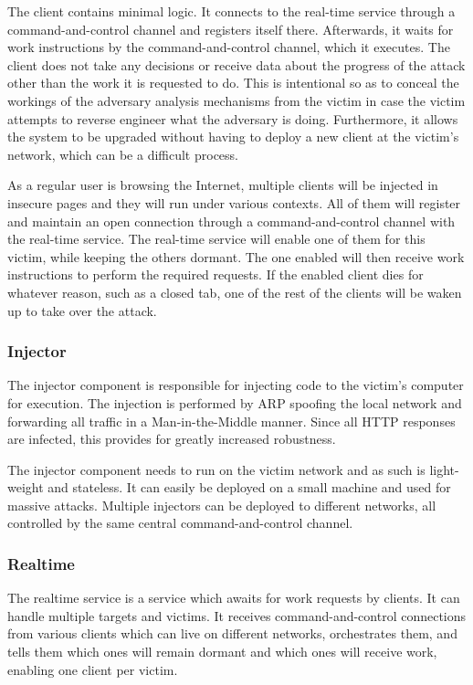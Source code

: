 \documentclass[conference, letterpaper, 10pt]{IEEEtran}
\begin{document}
The client contains minimal logic. It connects to the real-time service through
a command-and-control channel and registers itself there. Afterwards, it waits
for work instructions by the command-and-control channel, which it executes. The
client does not take any decisions or receive data about the progress of the
attack other than the work it is requested to do. This is intentional so as
to conceal the workings of the adversary analysis mechanisms from the victim
in case the victim attempts to reverse engineer what the adversary is doing.
Furthermore, it allows the system to be upgraded without having to deploy a
new client at the victim's network, which can be a difficult process.

As a regular user is browsing the Internet, multiple clients will be
injected in insecure pages and they will run under various contexts. All of
them will register and maintain an open connection through a
command-and-control channel with the real-time service. The real-time
service will enable one of them for this victim, while keeping the others
dormant. The one enabled will then receive work instructions to perform the
required requests. If the enabled client dies for whatever reason, such as a
closed tab, one of the rest of the clients will be waken up to take over the
attack.

\subsubsection{Injector}

The injector component is responsible for injecting code to the victim's
computer for execution. The injection is performed by ARP spoofing the local
network and forwarding all traffic in a Man-in-the-Middle manner. Since all HTTP
responses are infected, this provides for greatly increased robustness.

The injector component needs to run on the victim network and as such is
light-weight and stateless. It can easily be deployed on a small machine and
used for massive attacks. Multiple injectors can be deployed to different
networks, all controlled by the same central command-and-control channel.

\subsubsection{Realtime}

The realtime service is a service which awaits for work requests by clients. It
can handle multiple targets and victims. It receives command-and-control
connections from various clients which can live on different networks,
orchestrates them, and tells them which ones will remain dormant and which ones
will receive work, enabling one client per victim.
\end{document}
